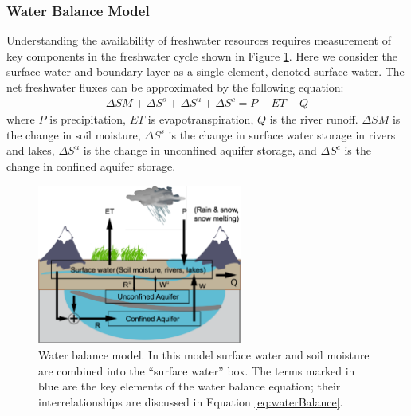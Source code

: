 \documentclass[11pt,final]{article}%
\begin{document}
\subsubsection{Water Balance Model}
Understanding the availability of freshwater resources requires measurement of key components in the freshwater cycle shown in Figure \ref{fig:watercycle}. Here we consider the surface water and boundary layer as a single element, denoted surface water. The net freshwater fluxes can be approximated by the following equation:
\begin{align}
\Delta SM +\Delta S^s +\Delta S^u + \Delta S^c = P-ET-Q
\label{eq:waterBalance}  
\end{align}
where $P$ is precipitation, $ET$ is evapotranspiration, $Q$ is the river runoff. $\Delta SM$ is the change in soil moisture, $\Delta S^s$ is the change in surface water storage in rivers and lakes, $\Delta S^u$ is the change in unconfined aquifer storage, and $\Delta S^c$  is the change in confined aquifer storage.

\begin{figure}
\noindent\includegraphics[width=0.6\textwidth]{Figures/watercycle.pdf}
\caption{Water balance model. In this model surface water and soil moisture are combined into the “surface water” box.  The terms marked in blue are the key elements of the water balance equation; their interrelationships are discussed in Equation \ref{eq:waterBalance}.}
\label{fig:watercycle}
\end{figure}
\end{document}
